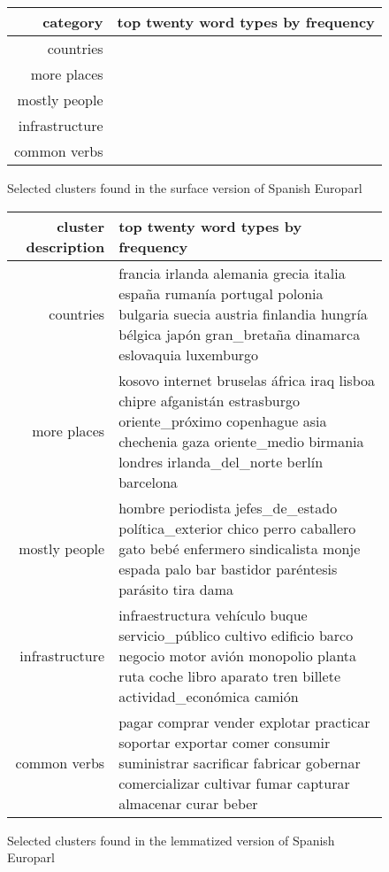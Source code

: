 \begin{figure*}[t!]
  \begin{tabular}{|r|p{10cm}|}
    \hline
    category  & top twenty word types by frequency \\
    \hline
    countries &  \\
    \hline
    more places & \\
    \hline
    mostly people & \\
    \hline
    infrastructure & \\
    \hline
    common verbs & \\
    \hline
  \end{tabular}
\caption{Selected clusters found in the surface version of Spanish Europarl}
\label{fig:clusters-europarl-surface}
\end{figure*}

\begin{figure*}[t!]
  \begin{tabular}{|r|p{10cm}|}
    \hline
    cluster description  & top twenty word types by frequency \\
    \hline
    countries & francia irlanda alemania grecia italia españa rumanía portugal polonia bulgaria suecia austria finlandia hungría bélgica japón gran\_bretaña dinamarca eslovaquia luxemburgo \\
    \hline
    more places & kosovo internet bruselas áfrica iraq lisboa chipre afganistán estrasburgo oriente\_próximo copenhague asia chechenia gaza oriente\_medio birmania londres irlanda\_del\_norte berlín barcelona \\
    \hline
    mostly people & hombre periodista jefes\_de\_estado política\_exterior chico perro caballero gato bebé enfermero sindicalista monje espada palo bar bastidor paréntesis parásito tira dama \\
    \hline
    infrastructure & infraestructura vehículo buque servicio\_público cultivo edificio barco negocio motor avión monopolio planta ruta coche libro aparato tren billete actividad\_económica camión \\
    \hline
    common verbs & pagar comprar vender explotar practicar soportar exportar comer consumir suministrar sacrificar fabricar gobernar comercializar cultivar fumar capturar almacenar curar beber \\
    \hline
  \end{tabular}
\caption{Selected clusters found in the lemmatized version of Spanish Europarl}
\label{fig:clusters-europarl-lemma}
\end{figure*}

